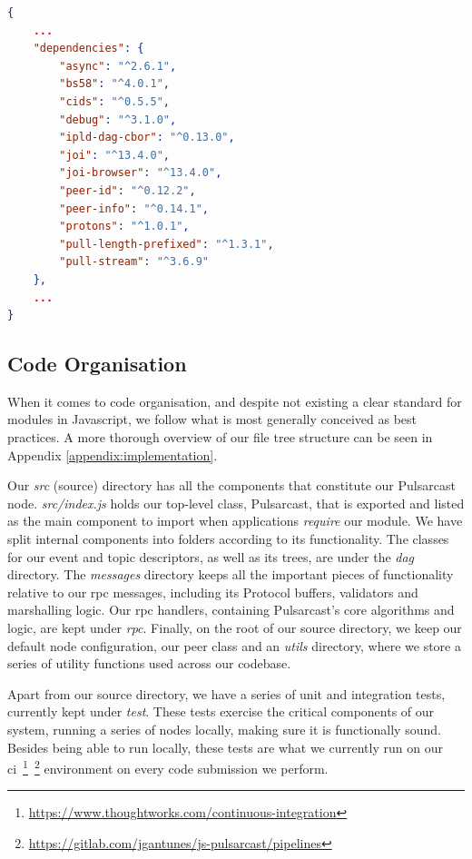 \begin{lstlisting}[language=JSON, float, caption={Pulsarcast module dependency list},label={dependencies}]
{
	...
	"dependencies": {
		"async": "^2.6.1",
		"bs58": "^4.0.1",
		"cids": "^0.5.5",
		"debug": "^3.1.0",
		"ipld-dag-cbor": "^0.13.0",
		"joi": "^13.4.0",
		"joi-browser": "^13.4.0",
		"peer-id": "^0.12.2",
		"peer-info": "^0.14.1",
		"protons": "^1.0.1",
		"pull-length-prefixed": "^1.3.1",
		"pull-stream": "^3.6.9"
	},
	...
}
\end{lstlisting}

\subsection{Code Organisation}\label{subsec:code-organisation}

When it comes to code organisation, and despite not existing a clear standard
for modules in Javascript, we follow what is most generally conceived as best
practices. A more thorough overview of our file tree structure can be seen in
Appendix \ref{appendix:implementation}.

Our \emph{src} (source) directory has all the components that constitute our
Pulsarcast node. \emph{src/index.js} holds our top-level class, Pulsarcast,
that is exported and listed as the main component to import when applications
\emph{require} our module. We have split internal components into folders
according to its functionality. The classes for our event and topic
descriptors, as well as its trees, are under the \emph{dag} directory. The
\emph{messages} directory keeps all the important pieces of functionality
relative to our \acrshort{rpc} messages, including its Protocol buffers,
validators and marshalling logic. Our \acrshort{rpc} handlers, containing
Pulsarcast's core algorithms and logic, are kept under \emph{rpc}. Finally, on
the root of our source directory, we keep our default node configuration, our
peer class and an \emph{utils} directory, where we store a series of utility
functions used across our codebase.

Apart from our source directory, we have a series of unit and integration
tests, currently kept under \emph{test}. These tests exercise the critical
components of our system, running a series of nodes locally, making sure it is
functionally sound. Besides being able to run locally, these tests are what we
currently run on our
\acrfull{ci}~\footnote{\url{https://www.thoughtworks.com/continuous-integration}}~\footnote{\url{https://gitlab.com/jgantunes/js-pulsarcast/pipelines}}
environment on every code submission we perform.

